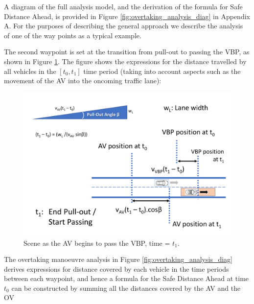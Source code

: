 A diagram of the full analysis model, and the derivation of the formula for Safe Distance Ahead, is provided in Figure \ref{fig:overtaking_analysis_diag} in Appendix A. For the purposes of describing the general approach we describe the analysis of one of the way points as a typical example. 

The second waypoint is set at the transition from pull-out to passing the VBP, as shown in Figure \ref{fig:Passing_t1}. The figure shows the expressions for the distance travelled by all vehicles in the \textit{$[t_0, t_1]$} time period (taking into account aspects such as the movement of the AV into the oncoming traffic lane):
 \begin{figure}
    \centering
    \includegraphics[width=0.98\linewidth]{../other/figures/Passing_t1_v2.png}
    \caption{Scene as the AV begins to pass the VBP, time = $t_1$.}
    \label{fig:Passing_t1}
 \end{figure}

The overtaking manoeuvre analysis in Figure \ref{fig:overtaking_analysis_diag} derives expressions for distance covered by each vehicle in the time periods between each waypoint, and hence a formula for the Safe Distance Ahead at time $t_0$ can be constructed by summing all the distances covered by the AV and the OV

